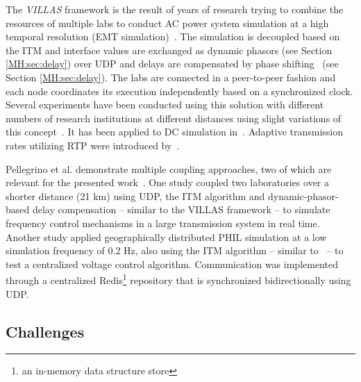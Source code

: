 \documentclass[a4paper]{atseminar}
\begin{document}

The \textit{VILLAS} framework is the result of years of research trying to combine the resources of multiple labs to conduct AC power system simulation at a high temporal resolution (EMT simulation)~\cite{stevic2017europe, monti2018, vogel2019improve}. 
The simulation is decoupled based on the ITM and interface values are exchanged as dynamic phasors (see Section \ref{MH:sec:delay}) over UDP and delays are compensated by phase shifting~\cite{sansano2015harmonic} (see Section \ref{MH:sec:delay}). The labs are connected in a peer-to-peer fashion and each node coordinates its execution independently based on a synchronized clock. Several experiments have been conducted using this solution with different numbers of research institutions at different distances using slight variations of this concept~\cite{stevic2017europe, monti2018, vogel2019improve, stevic2015feasibility, stevic2015sim, vogel2018distributed}.
It has been applied to DC simulation in~\cite{stevic2018dc}. Adaptive transmission rates utilizing RTP were introduced by~\cite{vogel2019improve}.


Pellegrino et al. demonstrate multiple coupling approaches, two of which are relevant for the presented work~\cite{strasser2019, pellegrino2020}. One study coupled two laboratories over a shorter distance (21 km) using UDP, the ITM algorithm and dynamic-phasor-based delay compensation -- similar to the VILLAS framework -- to simulate frequency control mechanisms in a large transmission system in real time. Another study applied geographically distributed PHIL simulation at a low simulation frequency of 0.2 Hz, also using the ITM algorithm -- similar to~\cite{palmintier2015} -- to test a centralized voltage control algorithm. Communication was implemented through a centralized Redis\footnote{an in-memory data structure store} repository that is synchronized bidirectionally using UDP.

\subsection{Challenges}
\label{MH:sec:challenges}
\end{document}

